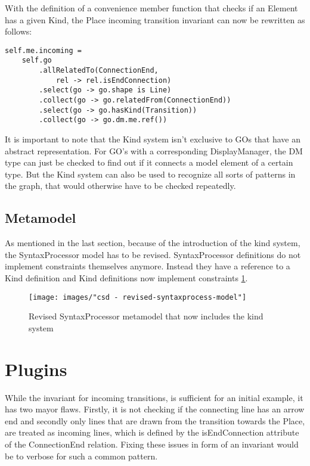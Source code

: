 With the definition of a convenience member function that checks if an Element has a given Kind, the Place incoming transition invariant can now be rewritten as follows: 
\begin{lstlisting}[language=OCL]
self.me.incoming = 
    self.go
        .allRelatedTo(ConnectionEnd, 
            rel -> rel.isEndConnection)
        .select(go -> go.shape is Line)
        .collect(go -> go.relatedFrom(ConnectionEnd))
        .select(go -> go.hasKind(Transition))
        .collect(go -> go.dm.me.ref())
\end{lstlisting}


It is important to note that the Kind system isn't exclusive to GOs that have an abstract representation. For GO's with a corresponding DisplayManager, the DM type can just be checked to find out if it connects a model element of a certain type. But the Kind system can also be used to recognize all sorts of patterns in the graph, that would otherwise have to be checked repeatedly.

\subsection{Metamodel}
As mentioned in the last section, because of the introduction of the kind system, the SyntaxProcessor model has to be revised. SyntaxProcessor definitions do not implement constraints themselves anymore. Instead they have a reference to a Kind definition and Kind definitions now implement constraints \ref{fig:revised-syntax-model}. 

\begin{figure}
\centering
\texttt{[image: images/"csd - revised-syntaxprocess-model"]}
\caption{Revised SyntaxProcessor metamodel that now includes the kind system}
\label{fig:revised-syntax-model}
\end{figure}


\section{Plugins}

While the invariant for incoming transitions, is sufficient for an initial example, it has two mayor flaws. Firstly, it is not checking if the connecting line has an arrow end and secondly only lines that are drawn from the transition towards the Place, are treated as incoming lines, which is defined by the isEndConnection attribute of the ConnectionEnd relation. Fixing these issues in form of an invariant would be to verbose for such a common pattern.

